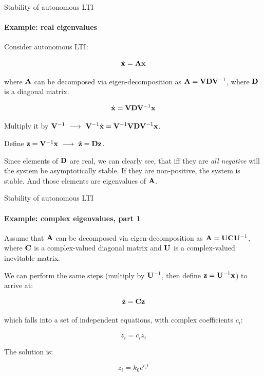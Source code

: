 \documentclass{beamer}
\begin{document}
\begin{frame}{Stability of autonomous LTI}
\framesubtitle{Example: real eigenvalues}
\begin{flushleft}

Consider autonomous LTI:

\begin{equation}
    \dot{\mathbf{x}} = \mathbf{A} \mathbf{x}
\end{equation}

where $\mathbf{A}$ can be decomposed via eigen-decomposition as $\mathbf{A} = \mathbf{V} \mathbf{D} \mathbf{V}^{-1}$, where $\mathbf{D}$ is a diagonal matrix. 

\bigskip

\begin{equation}
    \dot{\mathbf{x}} = \mathbf{V} \mathbf{D} \mathbf{V}^{-1} \mathbf{x}
\end{equation}

Multiply it by $\bo{V}^{-1} 
\ \longrightarrow \ 
\bo{V}^{-1} \dot{\bo{x}} = \bo{V}^{-1} \bo{V} \bo{D} \bo{V}^{-1} \bo{x}$.

Define $\mathbf{z} = \mathbf{V}^{-1} \mathbf{x} 
\ \longrightarrow \
\dot{\mathbf{z}} = \mathbf{D} \mathbf{z}$.

\bigskip

Since elements of $\mathbf{D}$ are real, we can clearly see, that iff they are \emph{all negative} will the system be asymptotically stable. If they are non-positive, the system is stable. And those elements are eigenvalues of $\mathbf{A}$.

\end{flushleft}
\end{frame}



\begin{frame}{Stability of autonomous LTI}
\framesubtitle{Example: complex eigenvalues, part 1}
\begin{flushleft}

Assume that $\mathbf{A}$ can be decomposed via eigen-decomposition as $\mathbf{A} = \mathbf{U} \mathbf{C} \mathbf{U}^{-1}$, where $\mathbf{C}$ is a complex-valued diagonal matrix and $\mathbf{U}$ is a complex-valued inevitable matrix. 

\bigskip

We can perform the same steps (multiply by $\mathbf{U}^{-1}$, then define $\mathbf{z} = \mathbf{U}^{-1} \mathbf{x}$) to arrive at:

\begin{equation}
    \dot{\mathbf{z}} = \mathbf{C} \mathbf{z}
\end{equation}

which falls into a set of independent equations, with complex coefficients $c_i$:

\begin{equation}
    \dot{z}_i = c_i z_i
\end{equation}

The solution is:

\begin{equation}
    z_i = k_0 e^{c_i t}
\end{equation}

\end{flushleft}
\end{frame}
\end{document}
